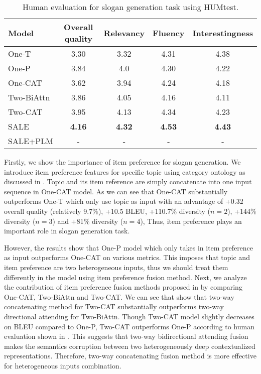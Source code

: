 \begin{table}[th]
	\small
	\centering
	\caption{Human evaluation for slogan generation task using HUMtest.}
	\label{tab:human_eval}
	\begin{tabular}{lcccc}
		\hline
		Model & Overall quality & Relevancy &  Fluency & Interestingness \\
		\hline
		One-T &  3.30  &  3.32 &  4.31   &  4.38 \\
		One-P &  3.84 &  4.0 &   4.30 &    4.22  \\
		One-CAT  &  3.62  & 3.94  & 4.24  & 4.18  \\
		Two-BiAttn  & 3.86  & 4.05  &  4.16  &  4.11     \\
		Two-CAT & 3.95  & 4.13  &  4.34 &  4.23   \\
		\hline\hline
		SALE & \textbf{4.16}  & \textbf{4.32}  & \textbf{4.53}  &  \textbf{4.43}  \\
		SALE+PLM & -  & -   &  - &   -  \\
		\hline 
	\end{tabular}
\end{table}



Firstly, we show the importance of item preference for  slogan generation.
We introduce item preference features for specific topic
using category ontology as discussed in .
Topic and its item reference are simply concatenate into one input sequence
in One-CAT model. 
As we can see that One-CAT substantially outperforms One-T which only use topic as input
with an advantage of +0.32 overall quality (relatively 9.7\%), +10.5 BLEU, +110.7\% diversity ($n=2$), +144\% diversity ($n=3$) and +81\% diversity ($n=4$),
Thus, item preference plays an important role in slogan generation task.

However, the results show that
One-P model which only takes in item preference as input outperforms
One-CAT on various metrics.
This imposes that topic and item preference are two heterogeneous inputs,
thus we should treat them differently in the model using item preference fusion method.
Next, we analyze the contribution of item preference fusion methods proposed
in 
by comparing One-CAT, Two-BiAttn and Two-CAT.
We can see that show that two-way concatenating method for Two-CAT
substantially outperforms two-way directional attending for Two-BiAttn.
Though Two-CAT model slightly decreases on BLEU compared to One-P,
Two-CAT outperforms One-P according to human evaluation shown in .
This suggests that two-way bidirectional attending fusion 
makes the semantics corruption between two heterogeneously deep contextualized representations.
Therefore, two-way concatenating fusion method is more effective for 
heterogeneous inputs combination.

